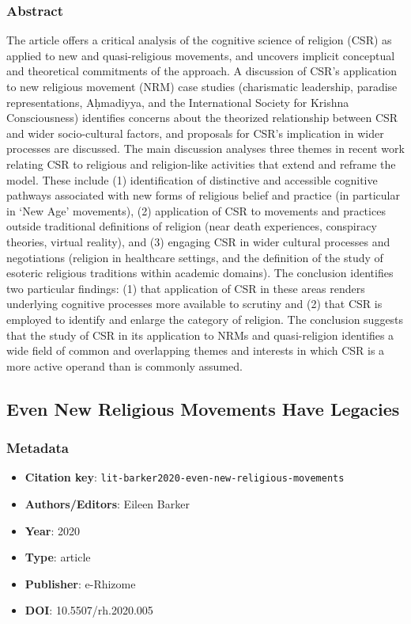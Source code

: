 \subsubsection*{Abstract}
The article offers a critical analysis of the cognitive science of religion (CSR) as applied to new and quasi-religious movements, and uncovers implicit conceptual and theoretical commitments of the approach. A discussion of CSR’s application to new religious movement (NRM) case studies (charismatic leadership, paradise representations, Aḥmadiyya, and the International Society for Krishna Consciousness) identifies concerns about the theorized relationship between CSR and wider socio-cultural factors, and proposals for CSR’s implication in wider processes are discussed. The main discussion analyses three themes in recent work relating CSR to religious and religion-like activities that extend and reframe the model. These include (1) identification of distinctive and accessible cognitive pathways associated with new forms of religious belief and practice (in particular in ‘New Age’ movements), (2) application of CSR to movements and practices outside traditional definitions of religion (near death experiences, conspiracy theories, virtual reality), and (3) engaging CSR in wider cultural processes and negotiations (religion in healthcare settings, and the definition of the study of esoteric religious traditions within academic domains). The conclusion identifies two particular findings: (1) that application of CSR in these areas renders underlying cognitive processes more available to scrutiny and (2) that CSR is employed to identify and enlarge the category of religion. The conclusion suggests that the study of CSR in its application to NRMs and quasi-religion identifies a wide field of common and overlapping themes and interests in which CSR is a more active operand than is commonly assumed.

\subsection{Even New Religious Movements Have Legacies}\label{lit:lit-barker2020-even-new-religious-movements}
\subsubsection*{Metadata}
\begin{itemize}
  \item \textbf{Citation key}: \texttt{lit-barker2020-even-new-religious-movements}
  \item \textbf{Authors/Editors}: Eileen Barker
  \item \textbf{Year}: 2020
  \item \textbf{Type}: article
  \item \textbf{Publisher}: e-Rhizome
  \item \textbf{DOI}: 10.5507/rh.2020.005
\end{itemize}
